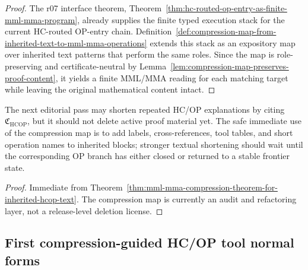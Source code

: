 \begin{proof}
The r07 interface theorem, Theorem~\ref{thm:hc-routed-op-entry-as-finite-mml-mma-program}, already supplies the finite typed execution stack for the current HC-routed OP-entry chain. Definition~\ref{def:compression-map-from-inherited-text-to-mml-mma-operations} extends this stack as an expository map over inherited text patterns that perform the same roles. Since the map is role-preserving and certificate-neutral by Lemma~\ref{lem:compression-map-preserves-proof-content}, it yields a finite MML/MMA reading for each matching target while leaving the original mathematical content intact.
\end{proof}

\begin{corollary}
\label{cor:v3340-r08-working-rule}
The next editorial pass may shorten repeated HC/OP explanations by citing \(\mathfrak C_{\mathrm{HCOP}}\), but it should not delete active proof material yet. The safe immediate use of the compression map is to add labels, cross-references, tool tables, and short operation names to inherited blocks; stronger textual shortening should wait until the corresponding OP branch has either closed or returned to a stable frontier state.
\end{corollary}

\begin{proof}
Immediate from Theorem~\ref{thm:mml-mma-compression-theorem-for-inherited-hcop-text}. The compression map is currently an audit and refactoring layer, not a release-level deletion license.
\end{proof}



\subsection{First compression-guided HC/OP tool normal forms}
\label{subsec:first-compression-guided-hcop-tool-normal-forms}

